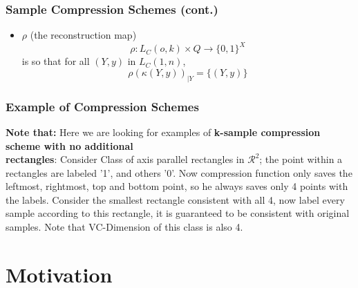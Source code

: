 \documentclass{beamer}
\begin{document}
\begin{frame}
\frametitle{Sample Compression Schemes (cont.)}
\begin{definition}

\begin{itemize}

\item
	$\rho$ (the reconstruction map)
    \begin{equation*}
    \rho: L_C(o,k) \times Q \to \{0,1\}^X
    \end{equation*}
	is so that for all $(Y,y)$ in $L_C(1,n)$,
    \begin{equation*}
    \rho(\kappa(Y,y))_{|Y} = \{(Y,y) \}
    \end{equation*}
\end{itemize}

\end{definition}


\end{frame}


\begin{frame}
\frametitle{Example of Compression Schemes}
\textbf{Note that:} Here we are looking for examples of \textbf{k-sample compression scheme with no additional}\\
\textbf{rectangles}: Consider Class of axis parallel rectangles in $\mathcal{R}^2$; the point within a rectangles are labeled '1', and others '0'. Now compression function only saves the leftmost, rightmost, top and bottom point, so he always saves only 4 points with the labels. Consider the smallest rectangle consistent with all 4, now label every sample according to this rectangle, it is guaranteed to be consistent with original samples. Note that VC-Dimension of this class is also 4.


\end{frame}


\section{Motivation}
\end{document}
